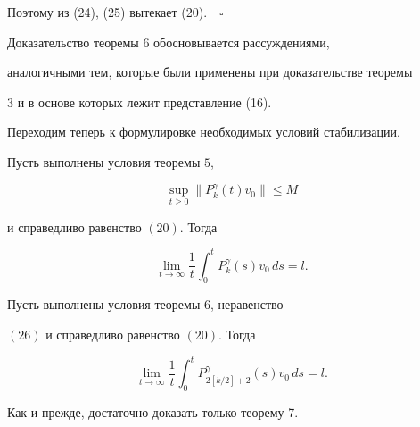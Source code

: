 Поэтому из (24), (25) вытекает (20).$\quad\square$


\medskip





Доказательство теоремы 6 обосновывается рассуждениями,


аналогичными тем, которые были применены при доказательстве теоремы


3 и в основе которых лежит представление (16).





Переходим теперь к формулировке необходимых условий стабилизации.





\begin{thm}


Пусть выполнены условия теоремы $5$,


\begin{equation}


\sup_{t \geq 0}\| P_k^\gamma(t)v_0\|\leq M


\end{equation}


и справедливо равенство $(20)$. Тогда


\begin{equation}


\lim_{t\to\infty}\frac{1}{t} \int_0^t


P_k^\gamma(s)v_0\, ds=l.


\end{equation}


\end{thm}





\begin{thm}


Пусть выполнены условия теоремы $6$, неравенство


$(26)$ и справедливо равенство $(20)$. Тогда


$$


\lim_{t\to\infty}\frac{1}{t} \int_0^t


P_{2[ k/2 ]+2}^\gamma(s)v_0\, ds=l.


$$


\end{thm}





Как и прежде, достаточно доказать только теорему 7.



